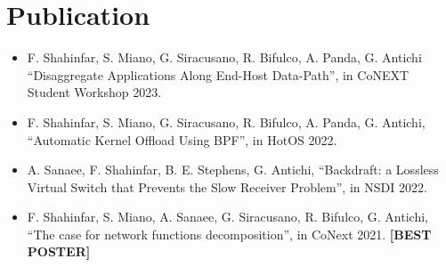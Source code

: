 \section {Publication}
\begin{itemize}
  \item F. Shahinfar, S. Miano, G. Siracusano, R. Bifulco, A. Panda, G. Antichi ``Disaggregate Applications Along End-Host Data-Path'', in CoNEXT Student Workshop 2023.
    \item F. Shahinfar, S. Miano, G. Siracusano, R. Bifulco, A. Panda, G. Antichi, ``Automatic Kernel Offload Using BPF'', in HotOS 2022.
    \item A. Sanaee, F. Shahinfar, B. E. Stephens, G. Antichi, ``Backdraft: a Lossless Virtual Switch that
        Prevents the Slow Receiver Problem'', in NSDI 2022.

    \item F. Shahinfar, S. Miano, A. Sanaee, G. Siracusano, R. Bifulco, G. Antichi,
        ``The case for network functions decomposition'', in CoNext 2021. \textbf{[BEST POSTER]}
\end{itemize}

